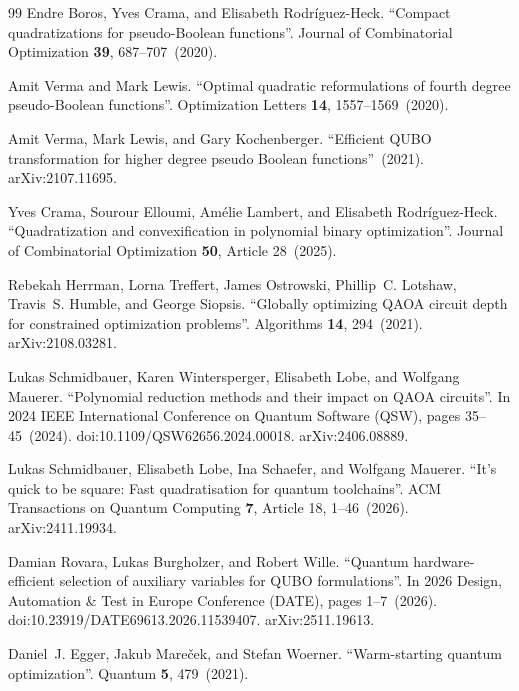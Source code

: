 \begin{thebibliography}{99}
Endre Boros, Yves Crama, and Elisabeth Rodr{\'i}guez-Heck.
\newblock ``Compact quadratizations for pseudo-Boolean functions''.
\newblock Journal of Combinatorial Optimization {\bf 39}, 687--707~(2020).

Amit Verma and Mark Lewis.
\newblock ``Optimal quadratic reformulations of fourth degree pseudo-Boolean functions''.
\newblock Optimization Letters {\bf 14}, 1557--1569~(2020).

Amit Verma, Mark Lewis, and Gary Kochenberger.
\newblock ``Efficient QUBO transformation for higher degree pseudo Boolean functions''~(2021).
\newblock arXiv:2107.11695.

Yves Crama, Sourour Elloumi, Am{\'e}lie Lambert, and Elisabeth Rodr{\'i}guez-Heck.
\newblock ``Quadratization and convexification in polynomial binary optimization''.
\newblock Journal of Combinatorial Optimization {\bf 50}, Article 28~(2025).

Rebekah Herrman, Lorna Treffert, James Ostrowski, Phillip~C. Lotshaw, Travis~S. Humble, and George Siopsis.
\newblock ``Globally optimizing QAOA circuit depth for constrained optimization problems''.
\newblock Algorithms {\bf 14}, 294~(2021).
\newblock arXiv:2108.03281.

Lukas Schmidbauer, Karen Wintersperger, Elisabeth Lobe, and Wolfgang Mauerer.
\newblock ``Polynomial reduction methods and their impact on QAOA circuits''.
\newblock In 2024 IEEE International Conference on Quantum Software (QSW), pages 35--45~(2024).
\newblock doi:10.1109/QSW62656.2024.00018.
\newblock arXiv:2406.08889.

Lukas Schmidbauer, Elisabeth Lobe, Ina Schaefer, and Wolfgang Mauerer.
\newblock ``It's quick to be square: Fast quadratisation for quantum toolchains''.
\newblock ACM Transactions on Quantum Computing {\bf 7}, Article 18, 1--46~(2026).
\newblock arXiv:2411.19934.

Damian Rovara, Lukas Burgholzer, and Robert Wille.
\newblock ``Quantum hardware-efficient selection of auxiliary variables for QUBO formulations''.
\newblock In 2026 Design, Automation \& Test in Europe Conference (DATE), pages 1--7~(2026).
\newblock doi:10.23919/DATE69613.2026.11539407.
\newblock arXiv:2511.19613.

Daniel~J. Egger, Jakub Mare{\v c}ek, and Stefan Woerner.
\newblock ``Warm-starting quantum optimization''.
\newblock Quantum {\bf 5}, 479~(2021).


\end{thebibliography}
